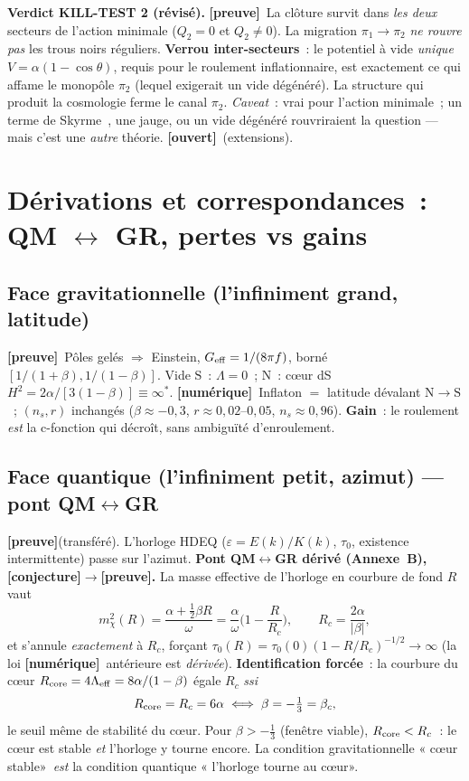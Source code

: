 \documentclass[11pt]{article}
\newcommand{\preuve}{{\small\textbf{[preuve]}}}
\newcommand{\num}{{\small\textbf{[num\'erique]}}}
\newcommand{\conj}{{\small\textbf{[conjecture]}}}
\newcommand{\ouv}{{\small\textbf{[ouvert]}}}
\newcommand{\Spole}{\mathrm{S}}
\newcommand{\Npole}{\mathrm{N}}
\theoremstyle{definition}
\begin{document}
\textbf{Verdict KILL-TEST 2 (r\'evis\'e).} \preuve\ La cl\^oture survit dans \emph{les deux} secteurs de
l'action minimale ($Q_2=0$ et $Q_2\ne0$). La migration $\pi_1\to\pi_2$ \emph{ne rouvre pas} les trous
noirs r\'eguliers. \textbf{Verrou inter-secteurs}~: le potentiel \`a vide \emph{unique}
$V=\alpha(1-\cos\theta)$, requis pour le roulement inflationnaire, est exactement ce qui affame le
monop\^ole $\pi_2$ (lequel exigerait un vide d\'eg\'en\'er\'e). La structure qui produit la cosmologie
ferme le canal $\pi_2$. \emph{Caveat}~: vrai pour l'action minimale~; un terme de Skyrme~\cite{Skyrme1961}, une jauge, ou un
vide d\'eg\'en\'er\'e rouvriraient la question --- mais c'est une \emph{autre} th\'eorie. \ouv\ (extensions).

\section{D\'erivations et correspondances~: QM $\leftrightarrow$ GR, pertes vs gains}

\subsection{Face gravitationnelle (l'infiniment grand, latitude)}
\preuve\ P\^oles gel\'es $\Rightarrow$ Einstein, $G_{\rm eff}=1/(8\pi f)$, born\'e
$[1/(1+\beta),1/(1-\beta)]$. Vide $\Spole$~: $\Lambda=0$~; $\Npole$~: c\oe ur dS
$H^2=2\alpha/[3(1-\beta)]\equiv\infty^\ast$. \num\ Inflaton $=$ latitude d\'evalant $\Npole\!\to\!\Spole$~;
$(n_s,r)$ inchang\'es ($\beta\approx-0{,}3$, $r\approx0{,}02$--$0{,}05$, $n_s\approx0{,}96$). \textbf{Gain}~:
le roulement \emph{est} la c-fonction qui d\'ecro\^it, sans ambigu\"it\'e d'enroulement.

\subsection{Face quantique (l'infiniment petit, azimut) --- pont QM$\leftrightarrow$GR}\label{sec:QM}
\preuve(transf\'er\'e). L'horloge HDEQ ($\varepsilon=E(k)/K(k)$, $\tau_0$, existence intermittente) passe
sur l'azimut. \textbf{Pont QM$\leftrightarrow$GR d\'eriv\'e (Annexe~B), \conj$\to$\preuve.} La masse
effective de l'horloge en courbure de fond $R$ vaut
\begin{equation}\label{eq:mass}
m_\chi^2(R)=\frac{\alpha+\tfrac12\beta R}{\omega}=\frac{\alpha}{\omega}\Big(1-\frac{R}{R_c}\Big),
\qquad R_c=\frac{2\alpha}{|\beta|},
\end{equation}
et s'annule \emph{exactement} \`a $R_c$, for\c{c}ant $\tau_0(R)=\tau_0(0)(1-R/R_c)^{-1/2}\to\infty$ (la loi
\num\ ant\'erieure est \emph{d\'eriv\'ee}). \textbf{Identification forc\'ee}~: la courbure du c\oe ur
$R_{\rm core}=4\Lambda_{\rm eff}=8\alpha/(1-\beta)$ \'egale $R_c$ \emph{ssi}
\begin{equation}\label{eq:lock}
R_{\rm core}=R_c=6\alpha\iff\beta=-\tfrac13=\beta_c,
\end{equation}
le seuil m\^eme de stabilit\'e du c\oe ur. Pour $\beta>-\tfrac13$ (fen\^etre viable), $R_{\rm core}<R_c$~:
le c\oe ur est stable \emph{et} l'horloge y tourne encore. La condition gravitationnelle « c\oe ur
stable»\ \emph{est} la condition quantique « l'horloge tourne au c\oe ur».
\end{document}
